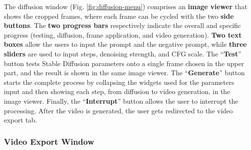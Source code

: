 \documentclass[preprint]{elsarticle}
\begin{document}
The diffusion window (Fig. \ref{fig:diffusion-menu}) comprises an \textbf{image viewer} that 
shows the cropped frames, where each frame can be cycled with the two \textbf{side buttons}. 
The \textbf{two progress bars} respectively indicate the overall and 
specific progress (testing, diffusion, frame application, and video generation). 
\textbf{Two text boxes} allow the users to input the prompt and the negative prompt, 
while \textbf{three sliders} are used to input steps, denoising strength, and CFG scale. 
The ``\textbf{Test}'' button tests Stable Diffusion parameters onto a single frame chosen 
in the upper part, and the result is shown in the same image viewer. 
The ``\textbf{Generate}'' button starts the complete process by collapsing the widgets used 
for the parameters input and then showing each step, from diffusion to video generation, 
in the image viewer. 
Finally, the ``\textbf{Interrupt}'' button allows the user to interrupt the processing. 
After the video is generated, the user gets redirected to the video export tab.

\subsubsection{Video Export Window}
\end{document}
